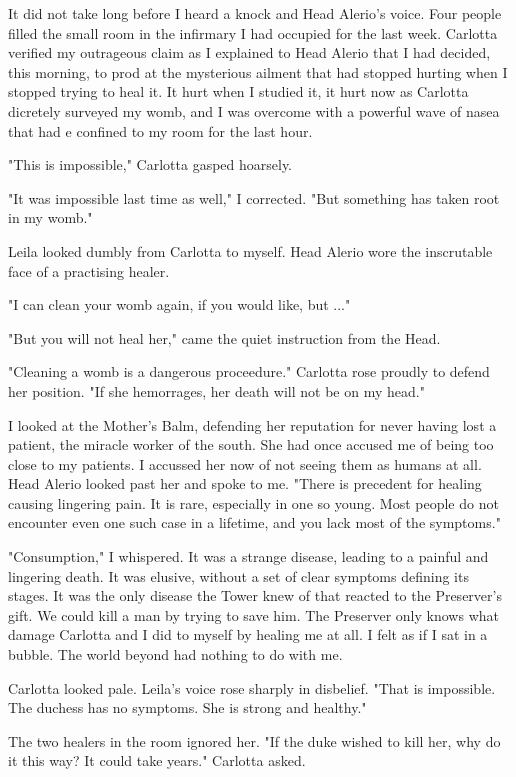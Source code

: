 \documentclass{article}
\begin{document}
It did not take long before I heard a knock and Head Alerio's voice. Four people filled the small room in the infirmary I had occupied for the last week. Carlotta verified my outrageous claim as I explained to Head Alerio that I had decided, this morning, to prod at the mysterious ailment that had stopped hurting when I stopped trying to heal it. It hurt when I studied it, it hurt now as Carlotta dicretely surveyed my womb, and I was overcome with a powerful wave of nasea that had e confined to my room for the last hour. 

"This is impossible," Carlotta gasped hoarsely.

"It was impossible last time as well," I corrected. "But something has taken root in my womb."

Leila looked dumbly from Carlotta to myself. Head Alerio wore the inscrutable face of a practising healer. 

"I can clean your womb again, if you would like, but ..."

"But you will not heal her," came the quiet instruction from the Head.

"Cleaning a womb is a dangerous proceedure." Carlotta rose proudly to defend her position. "If she hemorrages, her death will not be on my head."

I looked at the Mother's Balm, defending her reputation for never having lost a patient, the miracle worker of the south. She had once accused me of being too close to my patients. I accussed her now of not seeing them as humans at all. Head Alerio looked past her and spoke to me. "There is precedent for healing causing lingering pain. It is rare, especially in one so young. Most people do not encounter even one such case in a lifetime, and you lack most of the symptoms."

"Consumption," I whispered. It was a strange disease, leading to a painful and lingering death. It was elusive, without a set of clear symptoms defining its stages. It was the only disease the Tower knew of that reacted to the Preserver's gift. We could kill a man by trying to save him. The Preserver only knows what damage Carlotta and I did to myself by healing me at all. I felt as if I sat in a bubble. The world beyond had nothing to do with me. 

Carlotta looked pale. Leila's voice rose sharply in disbelief. "That is impossible. The duchess has no symptoms. She is strong and healthy." 

The two healers in the room ignored her. "If the duke wished to kill her, why do it this way? It could take years." Carlotta asked.
\end{document}
